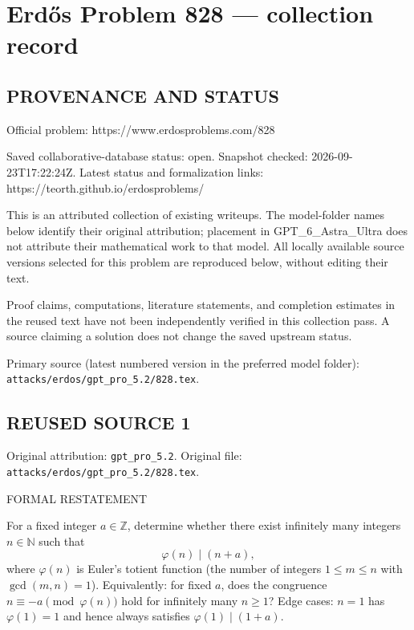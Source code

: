\section*{Erd\H{o}s Problem 828 --- collection record}

\subsection*{PROVENANCE AND STATUS}
Official problem: https://www.erdosproblems.com/828

Saved collaborative-database status: open.
Snapshot checked: 2026-09-23T17:22:24Z.
Latest status and formalization links: https://teorth.github.io/erdosproblems/

This is an attributed collection of existing writeups. The model-folder names below identify their original attribution; placement in GPT\_6\_Astra\_Ultra does not attribute their mathematical work to that model. All locally available source versions selected for this problem are reproduced below, without editing their text.

Proof claims, computations, literature statements, and completion estimates in the reused text have not been independently verified in this collection pass. A source claiming a solution does not change the saved upstream status.

Primary source (latest numbered version in the preferred model folder): \texttt{attacks/erdos/gpt\_pro\_5.2/828.tex}.

\subsection*{REUSED SOURCE 1}
Original attribution: \texttt{gpt\_pro\_5.2}.
Original file: \texttt{attacks/erdos/gpt\_pro\_5.2/828.tex}.



FORMAL RESTATEMENT

For a fixed integer $a\in\mathbb{Z}$, determine whether there exist infinitely many integers $n\in\mathbb{N}$ such that
\[
\varphi(n)\mid (n+a),
\]
where $\varphi(n)$ is Euler's totient function (the number of integers $1\leq m\leq n$ with $\gcd(m,n)=1$).
Equivalently: for fixed $a$, does the congruence $n\equiv -a\pmod{\varphi(n)}$ hold for infinitely many $n\ge1$?
Edge cases: $n=1$ has $\varphi(1)=1$ and hence always satisfies $\varphi(1)\mid (1+a)$.

